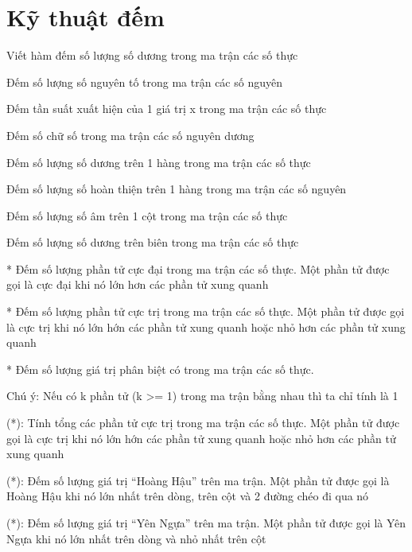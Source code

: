 \section{Kỹ thuật đếm}
\begin{problem}
    Viết hàm đếm số lượng số dương trong ma trận các số thực
\end{problem}
\begin{problem}
    Đếm số lượng số nguyên tố trong ma trận các số nguyên
\end{problem}
\begin{problem}
    Đếm tần suất xuất hiện của 1 giá trị x trong ma trận các số thực
\end{problem}
\begin{problem}
    Đếm số chữ số trong ma trận các số nguyên dương
\end{problem}
\begin{problem}
    Đếm số lượng số dương trên 1 hàng trong ma trận các số thực
\end{problem}
\begin{problem}
    Đếm số lượng số hoàn thiện trên 1 hàng trong ma trận các số nguyên
\end{problem}
\begin{problem}
    Đếm số lượng số âm trên 1 cột trong ma trận các số thực
\end{problem}
\begin{problem}
    Đếm số lượng số dương trên biên trong ma trận các số thực
\end{problem}
\begin{problem}
    * Đếm số lượng phần tử cực đại trong ma trận các số thực. Một phần tử được gọi là cực đại khi nó lớn hơn các phần tử xung quanh
\end{problem}
\begin{problem}
    * Đếm số lượng phần tử cực trị trong ma trận các số thực. Một phần tử được gọi là cực trị khi nó lớn hớn các phần tử xung quanh hoặc nhỏ hơn các phần tử xung quanh
\end{problem}
\begin{problem}
    * Đếm số lượng giá trị phân biệt có trong ma trận các số thực.

    Chú ý: Nếu có k phần tử (k >= 1) trong ma trận bằng nhau thì ta chỉ tính là 1
\end{problem}
\begin{problem}
    (*): Tính tổng các phần tử cực trị trong ma trận các số thực. Một phần tử được gọi là cực trị khi nó lớn hớn các phần tử xung quanh hoặc nhỏ hơn các phần tử xung quanh
\end{problem}
\begin{problem}
    (*): Đếm số lượng giá trị “Hoàng Hậu” trên ma trận. Một phần tử được gọi là Hoàng Hậu khi nó lớn nhất trên dòng, trên cột và 2 đường chéo đi qua nó
\end{problem}
\begin{problem}
    (*): Đếm số lượng giá trị “Yên Ngựa” trên ma trận. Một phần tử được gọi là Yên Ngựa khi nó lớn nhất trên dòng và nhỏ nhất trên cột
\end{problem}


